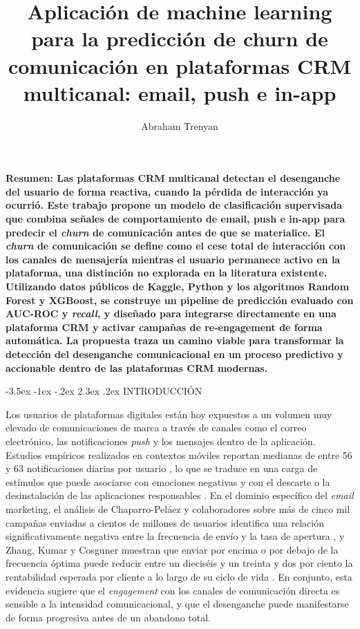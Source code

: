 \documentclass[11pt,a4paper]{article}
\title{\textbf{Aplicación de machine learning para la predicción de churn
de comunicación en plataformas CRM multicanal: email, push e in-app}}
\author{Abraham Trenyan}
\date{}
\makeatletter
\renewcommand\section{\@startsection{section}{1}{\z@}%
  {-3.5ex \@plus -1ex \@minus -.2ex}%
  {2.3ex \@plus.2ex}%
  {\normalfont\normalsize\centering}}
\makeatother
\begin{document}
\twocolumn[
  \maketitle
  \vspace{-0.5em}
]
\noindent\textbf{Resumen: Las plataformas CRM multicanal detectan el desenganche
del usuario de forma reactiva, cuando la pérdida de interacción ya ocurrió.
Este trabajo propone un modelo de clasificación supervisada que combina señales
de comportamiento de email, push e in-app para predecir el \textit{churn} de
comunicación antes de que se materialice. El \textit{churn} de comunicación
se define como el cese total de interacción con los canales de mensajería
mientras el usuario permanece activo en la plataforma, una distinción no
explorada en la literatura existente. Utilizando datos públicos de Kaggle,
Python y los algoritmos Random Forest y XGBoost, se construye un pipeline de
predicción evaluado con AUC-ROC y \textit{recall}, y diseñado para integrarse
directamente en una plataforma CRM y activar campañas de re-engagement de
forma automática. La propuesta traza un camino viable para transformar la
detección del desenganche comunicacional en un proceso predictivo y
accionable dentro de las plataformas CRM modernas.}
\vspace{0.8em}

\section{INTRODUCCIÓN}

Los usuarios de plataformas digitales están hoy expuestos a un volumen muy
elevado de comunicaciones de marca a través de canales como el correo
electrónico, las notificaciones \textit{push} y los mensajes dentro de la
aplicación. Estudios empíricos realizados en contextos móviles reportan
medianas de entre 56 y 63 notificaciones diarias por usuario
\cite{pielot2014insitu}, lo que se traduce en una carga de estímulos que
puede asociarse con emociones negativas y con el descarte o la desinstalación
de las aplicaciones responsables \cite{pielot2014insitu,okoshi2015attelia}.
En el dominio específico del \textit{email} marketing, el análisis de
Chaparro-Peláez y colaboradores sobre más de cinco mil campañas enviadas a
cientos de millones de usuarios identifica una relación significativamente
negativa entre la frecuencia de envío y la tasa de apertura
\cite{chaparropelaez2022attention}, y Zhang, Kumar y Cosguner muestran que
enviar por encima o por debajo de la frecuencia óptima puede reducir entre
un dieciséis y un treinta y dos por ciento la rentabilidad esperada por
cliente a lo largo de su ciclo de vida \cite{zhang2017dynamically}. En
conjunto, esta evidencia sugiere que el \textit{engagement} con los canales
de comunicación directa es sensible a la intensidad comunicacional, y que
el desenganche puede manifestarse de forma progresiva antes de un abandono
total.
\end{document}
